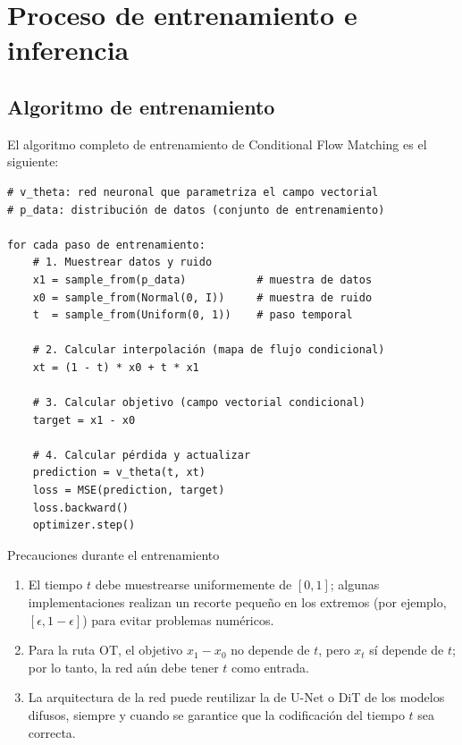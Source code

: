 \section{Proceso de entrenamiento e inferencia}

\subsection{Algoritmo de entrenamiento}

El algoritmo completo de entrenamiento de Conditional Flow Matching es el siguiente:

\begin{lstlisting}[caption={Algoritmo de entrenamiento de Conditional Flow Matching (ruta OT)}]
# v_theta: red neuronal que parametriza el campo vectorial
# p_data: distribución de datos (conjunto de entrenamiento)

for cada paso de entrenamiento:
    # 1. Muestrear datos y ruido
    x1 = sample_from(p_data)           # muestra de datos
    x0 = sample_from(Normal(0, I))     # muestra de ruido
    t  = sample_from(Uniform(0, 1))    # paso temporal

    # 2. Calcular interpolación (mapa de flujo condicional)
    xt = (1 - t) * x0 + t * x1

    # 3. Calcular objetivo (campo vectorial condicional)
    target = x1 - x0

    # 4. Calcular pérdida y actualizar
    prediction = v_theta(t, xt)
    loss = MSE(prediction, target)
    loss.backward()
    optimizer.step()
\end{lstlisting}

\begin{warningbox}{Precauciones durante el entrenamiento}
\begin{enumerate}
    \item El tiempo $t$ debe muestrearse uniformemente de $[0, 1]$; algunas implementaciones realizan un recorte pequeño en los extremos (por ejemplo, $[\epsilon, 1-\epsilon]$) para evitar problemas numéricos.
    \item Para la ruta OT, el objetivo $x_1 - x_0$ no depende de $t$, pero $x_t$ sí depende de $t$; por lo tanto, la red aún debe tener $t$ como entrada.
    \item La arquitectura de la red puede reutilizar la de U-Net o DiT de los modelos difusos, siempre y cuando se garantice que la codificación del tiempo $t$ sea correcta.
\end{enumerate}
\end{warningbox}

